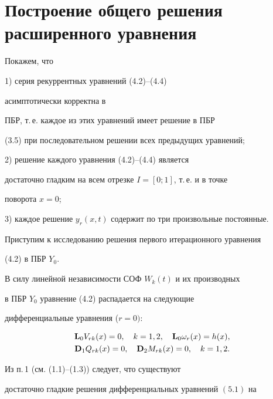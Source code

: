 \section{Построение общего решения расширенного уравнения}





Покажем, что





1) серия рекуррентных уравнений (4.2)--(4.4)


асимптотически корректна в


ПБР, т.\,е. каждое из этих уравнений имеет решение в ПБР


(3.5) при последовательном решении всех предыдущих уравнений;





2) решение каждого уравнения (4.2)--(4.4) является


достаточно гладким на всем отрезке ${I=[0; 1]}$, т.\,е. и в точке


поворота $x=0$;





3) каждое решение $y_r (x,t)$ содержит по три произвольные постоянные.





Приступим к исследованию решения первого итерационного уравнения


(4.2) в ПБР $Y_0$.


В силу линейной независимости СОФ $W_k (t)$ и их производных


в ПБР $Y_0$ уравнение (4.2) распадается на следующие


дифференциальные уравнения ($r=0)$:


\begin{gather}


\bold{L}_0 V_{rk} (x) = 0, \quad k = 1,2, \quad \bold{L}_0


\o_r (x) = h(x), \\


\bold{D}_1 Q_{rk} (x) = 0, \quad \bold{D}_2 M_{rk} (x) =0,


\quad k = 1,2.


\end{gather}


Из п.\,1 (см. (1.1)--(1.3)) следует, что существуют


достаточно гладкие решения дифференциальных уравнений $ (5.1)$ на


